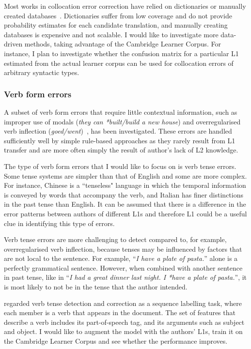 \documentclass[11pt]{article}
\begin{document}
Most works in collocation error correction have relied on dictionaries or 
manually created databases~\citep{shei2000esl, wible2003bootstrapping, 
futagi2008computational}. Dictionaries suffer from low coverage and do not 
provide probability estimates for each candidate translation, and manually 
creating databases is expensive and not scalable. I would like to investigate 
more data-driven methods, taking advantage of the Cambridge Learner Corpus. For 
instance, I plan to investigate whether the confusion matrix for a particular L1 
estimated from the actual learner corpus can be used for collocation errors of 
arbitrary syntactic types.


\subsubsection{Verb form errors}
\label{subsub:verb}
A subset of verb form errors that require little contextual information, such as improper use of modals (\emph{they can *built/build 
a new house}) and overregularised verb inflection 
({\em *goed/went})~\citep{chodorow2000unsupervised, leacock2003automated}, has been 
investigated. These 
errors are handled sufficiently well by simple rule-based approaches as they rarely 
result from L1 transfer and are more often simply the result of author's lack of L2 knowledge.

The type of verb 
form errors that I would like to focus on is verb tense errors. Some tense 
systems are simpler than that of English and some are more complex. For 
instance, Chinese is a ``tenseless" language in which the temporal information is 
conveyed by words that accompany the verb, and Italian has finer distinctions in 
the past tense than English. It can be assumed that there is a difference in the 
error patterns between authors of different L1s and therefore L1 could be a useful 
clue in identifying this type of errors.

Verb tense errors are more challenging 
to detect compared to, for example, overregularised verb inflection, because 
tenses may be influenced by factors that are not local to the sentence. For 
example, ``{\em I have a plate of pasta.}'' alone is a perfectly grammatical sentence. 
However, when combined with another sentence in past tense, like in ``{\em I had a 
great dinner last night. I *have a plate of pasta.}'', it is most likely to not be in 
the tense that the author intended.

\cite{tajiri2012tense} regarded verb tense detection and correction as a 
sequence labelling task, where each member is a verb that appears in the 
document. The set of features that describe a verb includes its 
part-of-speech tag, and its arguments such as subject and object. I would like to 
augment the model with the authors' L1s, train it on the Cambridge Learner Corpus 
and see whether the performance improves.
\end{document}
